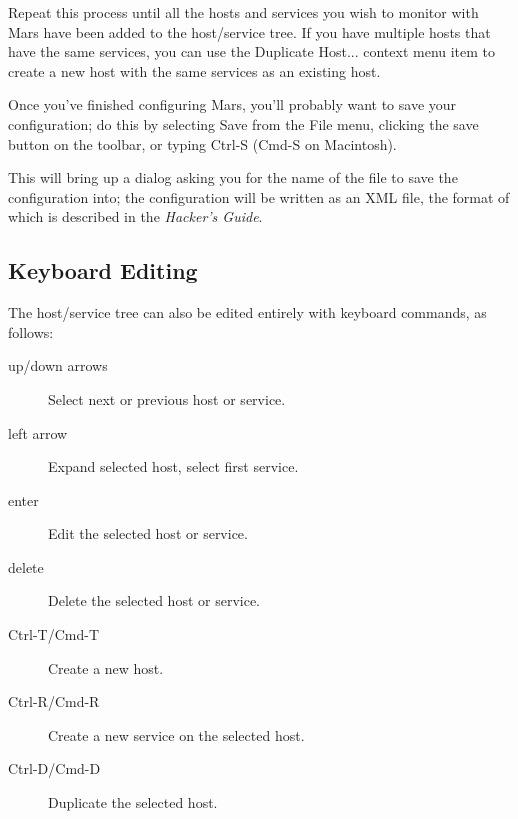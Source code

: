 \documentclass{article}
\newcommand{\guiitem}[1]{{\sf #1}}
\newcommand{\keystroke}[1]{{\sf #1}}
\begin{document}
Repeat this process until all the hosts and services you wish to
monitor with Mars have been added to the host/service tree. If you
have multiple hosts that have the same services, you can use the
\guiitem{Duplicate Host...} context menu item to create a new host
with the same services as an existing host.

Once you've finished configuring Mars, you'll probably want to save
your configuration; do this by selecting \guiitem{Save} from the
\guiitem{File} menu, clicking the save button on the toolbar, or
typing \keystroke{Ctrl-S} (\keystroke{Cmd-S} on Macintosh).

This will bring up a dialog asking you for the name of the file to
save the configuration into; the configuration will be written as an
XML file, the format of which is described in the {\sl Hacker's
  Guide}.

\subsection{Keyboard Editing}

The host/service tree can also be edited entirely with keyboard
commands, as follows:

\begin{description}
\item[up/down arrows] Select next or previous host or service.
\item[left arrow] Expand selected host, select first service.
\item[enter] Edit the selected host or service.
\item[delete] Delete the selected host or service.
\item[Ctrl-T/Cmd-T] Create a new host.
\item[Ctrl-R/Cmd-R] Create a new service on the selected host.
\item[Ctrl-D/Cmd-D] Duplicate the selected host.
\end{description}
\end{document}
